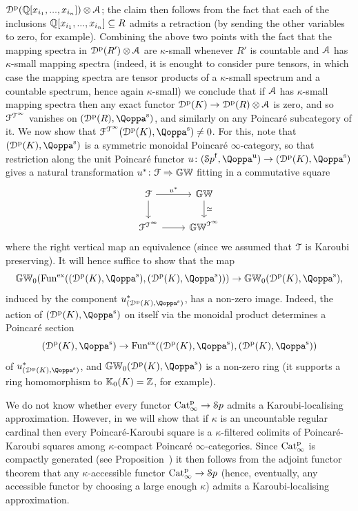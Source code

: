 \begin{example}
${\mathcal D}^{\mathrm{p}}(\mathbb{Q}[x_{i_1},...,x_{i_n}]) \otimes \mathcal{A}$; the claim then follows from the fact that each of the inclusions $\mathbb{Q}[x_{i_1},...,x_{i_n}] \subseteq R$ admits a retraction (by sending the other variables to zero, for example).
Combining the above two points with the fact that the mapping spectra in ${\mathcal D}^{\mathrm{p}}(R')\otimes \mathcal{A}$ are $\kappa$-small whenever $R'$ is countable and $\mathcal{A}$ has $\kappa$-small mapping spectra (indeed, it is enought to consider pure tensors, in which case the mapping spectra are tensor products of a $\kappa$-small spectrum and a countable spectrum, hence again $\kappa$-small) we conclude that if $\mathcal{A}$ has $\kappa$-small mapping spectra then any exact functor ${\mathcal D}^{\mathrm{p}}(K) \to {\mathcal D}^{\mathrm{p}}(R)\otimes \mathcal{A}$ is zero, and so $\mathcal{F}^{\mathcal{T}^{\infty}}$ vanishes on $(\Dperf(R),\QF^{\sym})$, and similarly on any Poincaré subcategory of it. We now show that $\F^{\T^{\infty}}(\Dperf(K),\QF^{\sym}) \neq 0$. For this, note that $(\Dperf(K),\QF^{\sym})$ is a symmetric monoidal Poincaré $\infty$-category, so that restriction along the unit Poincaré functor $u\colon (\Spaf,\QF^{\uni}) \to (\Dperf(K),\QF^{\sym})$ gives a natural transformation $u^*\colon \mathcal{F} \Rightarrow \mathbb{GW}$ fitting in a commutative square
\[
\begin{tikzcd}
\F\ar[r,"u^*"]\ar[d] & \KGW \ar[d,"\simeq"] \\
\F^{\T^{\infty}}\ar[r] & \KGW^{\T^{\infty}} 
\end{tikzcd}
\]
where the right vertical map an equivalence (since we assumed that $\mathcal{T}$ is Karoubi preserving).
It will hence suffice to show that the map
\[
\KGW_0(\Funx((\Dperf(K),\QF^{\sym}),(\Dperf(K),\QF^{\sym}))) \to \KGW_0(\Dperf(K),\QF^{\sym}) ,
\]
induced by the component $u^*_{(\Dperf(K),\QF^{\sym})}$, has a non-zero image. Indeed, the action of $(\Dperf(K),\QF^{\sym})$ on itself via the monoidal product determines a Poincaré section 
\[
(\Dperf(K),\QF^{\sym}) \to \Funx((\Dperf(K),\QF^{\sym}),(\Dperf(K),\QF^{\sym}))
\]
of $u^*_{(\Dperf(K),\QF^{\sym})}$, and $\KGW_0(\Dperf(K),\QF^{\sym})$ is a non-zero ring (it supports a ring homomorphism to $\mathbb K_0(K) = \mathbb{Z}$, for example). 
\end{example}

\begin{remark}
\label{rem:accessible-functors-have-Karoubi-approximations}%
We do not know whether every functor $\mathrm{Cat}^{\mathrm p}_\infty \to {\mathcal Sp}$ admits a Karoubi-localising approximation. However, in \paperfive 
we will show that if $\kappa$ is an uncountable regular cardinal then every Poincaré-Karoubi square is a $\kappa$-filtered colimits of Poincaré-Karoubi squares among $\kappa$-compact Poincaré $\infty$-categories.
Since $\mathrm{Cat}^{\mathrm p}_\infty$ is compactly generated (see Proposition~) it then follows from the adjoint functor theorem that any $\kappa$-accessible functor $\mathrm{Cat}^{\mathrm p}_\infty \to {\mathcal Sp}$ (hence, eventually, any accessible functor by choosing a large enough $\kappa$) admits a Karoubi-localising approximation. 
\end{remark}





